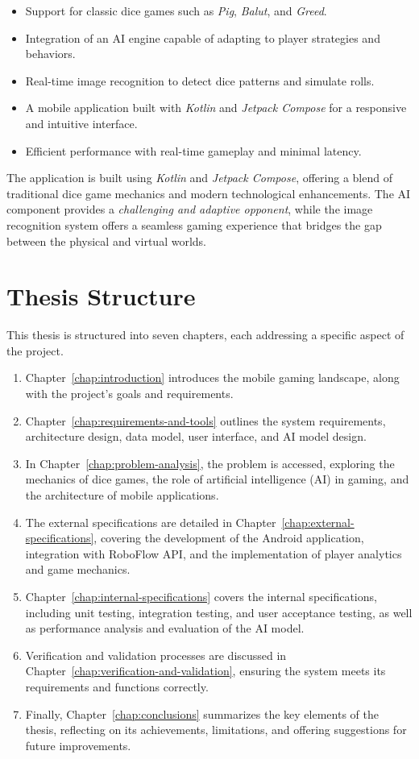 \begin{itemize}
    \item Support for classic dice games such as \emph{Pig}, \emph{Balut}, and \emph{Greed}.
    \item Integration of an AI engine capable of adapting to player strategies and behaviors.
    \item Real-time image recognition to detect dice patterns and simulate rolls.
    \item A mobile application built with \emph{Kotlin} and \emph{Jetpack Compose} for a responsive and intuitive interface.
    \item Efficient performance with real-time gameplay and minimal latency.
\end{itemize}

The application is built using \emph{Kotlin} and \emph{Jetpack Compose}, offering a blend of traditional dice game mechanics and modern technological enhancements. The AI component provides a \emph{challenging and adaptive opponent}, while the image recognition system offers a seamless gaming experience that bridges the gap between the physical and virtual worlds.

\section{Thesis Structure}
This thesis is structured into seven chapters, each addressing a specific aspect of the project.

\begin{enumerate}
    \item Chapter~\ref{chap:introduction} introduces the mobile gaming landscape, along with the project's goals and requirements.
    \item Chapter~\ref{chap:requirements-and-tools} outlines the system requirements, architecture design, data model, user interface, and AI model design.
    \item In Chapter~\ref{chap:problem-analysis}, the problem is accessed, exploring the mechanics of dice games, the role of artificial intelligence (AI) in gaming, and the architecture of mobile applications.
    \item The external specifications are detailed in Chapter~\ref{chap:external-specifications}, covering the development of the Android application, integration with RoboFlow API, and the implementation of player analytics and game mechanics.
    \item Chapter~\ref{chap:internal-specifications} covers the internal specifications, including unit testing, integration testing, and user acceptance testing, as well as performance analysis and evaluation of the AI model.
    \item Verification and validation processes are discussed in Chapter~\ref{chap:verification-and-validation}, ensuring the system meets its requirements and functions correctly.
    \item Finally, Chapter~\ref{chap:conclusions} summarizes the key elements of the thesis, reflecting on its achievements, limitations, and offering suggestions for future improvements.
\end{enumerate}
